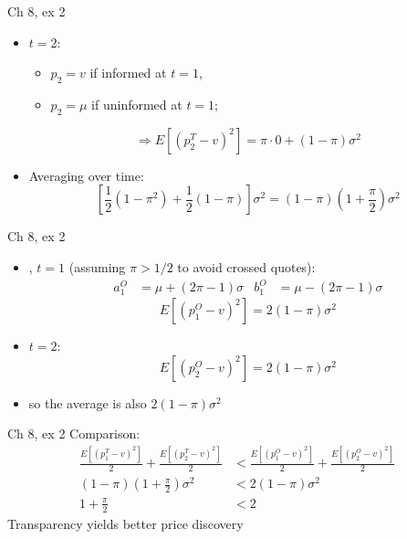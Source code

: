 \documentclass[english,10pt
,aspectratio=169
]{beamer}
\begin{document}
\begin{frame}{Ch 8, ex 2}
	\begin{itemize}
		\item $t=2$:
		\begin{itemize}
			\item $p_2 = v$ if informed at $t=1$,
			\item $p_2 = \mu$ if uninformed at $t=1$;
		\end{itemize}
		\[ \Rightarrow E\left[ (p_{2}^{T}-v)^{2}\right] = \pi \cdot 0 + (1-\pi) \sigma^2 \]
		\item Averaging over time:
		\[ \left[\frac{1}{2}(1-\pi^2)+\frac{1}{2}(1-\pi) \right] \sigma^2 = (1-\pi)\left(1+\frac{\pi}{2}\right) \sigma^2 \]
	\end{itemize}
\end{frame}


\begin{frame}{Ch 8, ex 2}
	\begin{itemize}
		\item {}, $t=1$ (assuming $\pi > 1/2$ to avoid crossed quotes):
		\begin{align*}
			a_1^O &= \mu + (2\pi-1)\sigma & b_1^O &= \mu - (2\pi-1)\sigma
		\end{align*}
		\[ E\left[ (p_{1}^{O}-v)^{2}\right] = 2(1-\pi)\sigma^2 \]
		\pause
		\item $t=2$:
		\[ E\left[ (p_{2}^{O}-v)^{2}\right] = 2(1-\pi)\sigma^2 \]
		\item so the average is also $2(1-\pi)\sigma^2$
	\end{itemize}
\end{frame}


\begin{frame}{Ch 8, ex 2}
	Comparison:
	\begin{align*}
		\frac{E\left[ (p_{1}^{T}-v)^{2} \right]}{2} + \frac{E\left[ (p_{2}^{T}-v)^{2} \right]}{2} &< \frac{E\left[ (p_{1}^{O}-v)^{2} \right]}{2} + \frac{E\left[ (p_{2}^{O}-v)^{2} \right]}{2}
		\\
		(1-\pi)\left(1+\frac{\pi}{2}\right) \sigma^2 &< 2(1-\pi)\sigma^2
		\\
		1+\frac{\pi}{2} &< 2
	\end{align*}
	Transparency yields better price discovery
\end{frame}
\end{document}
